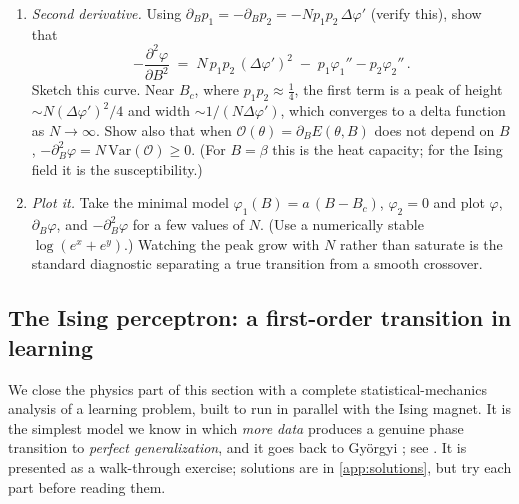 \documentclass[11pt]{article}
\newcommand{\CO}{{\mathcal O}}
\newcommand{\pd}{\partial}
\begin{document}
\begin{exercise}
\begin{enumerate}
    \item \emph{Second derivative.} Using $\pd_B p_1 = -\pd_B p_2 = -N p_1p_2\,\Delta\varphi'$ (verify this), show that
    \begin{equation} \label{chi-peak}
        -\frac{\pd^2\varphi}{\pd B^2} \;=\; N\,p_1p_2\,(\Delta\varphi')^2 \;-\; p_1\varphi_1'' - p_2\varphi_2''\,.
    \end{equation}
    Sketch this curve. Near $B_c$, where $p_1p_2\approx\frac{1}{4}$, the first term is a peak of height $\sim N(\Delta\varphi')^2/4$ and width $\sim 1/(N\Delta\varphi')$, which converges to a delta function as $N\to\infty$. Show also that when $\CO(\theta) = \pd_BE(\theta,B)$ does not depend on $B$, $-\pd_B^2\varphi = N\,\mathrm{Var}(\CO)\geq 0$. (For $B=\beta$ this is the heat capacity; for the Ising field it is the susceptibility.)
    \item \emph{Plot it.} Take the minimal model $\varphi_1(B) = a\,(B-B_c)$, $\varphi_2 = 0$ and plot $\varphi$, $\pd_B\varphi$, and $-\pd_B^2\varphi$ for a few values of $N$. (Use a numerically stable $\log(e^x+e^y)$.) Watching the peak grow with $N$ rather than saturate is the standard diagnostic separating a true transition from a smooth crossover.
\end{enumerate}
\end{exercise}

\subsection{The Ising perceptron: a first-order transition in learning}
\label{sec:ising}

We close the physics part of this section with a complete statistical-mechanics analysis of a learning problem, built to run in parallel with the Ising magnet. It is the simplest model we know in which \emph{more data} produces a genuine phase transition to \emph{perfect generalization}, and it goes back to Gy\"orgyi \cite{gyorgyi1990first}; see \cite[Chapter 7]{engel2001statistical}. It is presented as a walk-through exercise; solutions are in \cref{app:solutions}, but try each part before reading them.
\end{document}
